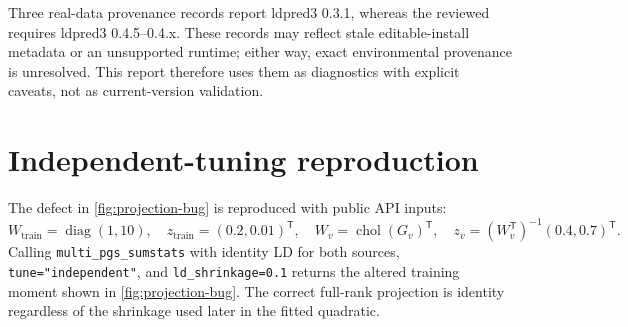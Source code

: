 \documentclass[10pt,a4paper]{article}
\newcommand{\code}[1]{\texttt{#1}}
\begin{document}
Three real-data provenance records report ldpred3 0.3.1, whereas the reviewed
 requires ldpred3 0.4.5--0.4.x. These records may reflect
stale editable-install metadata or an unsupported runtime; either way, exact
environmental provenance is unresolved. This report therefore uses them as
diagnostics with explicit caveats, not as current-version validation.

\section{Independent-tuning reproduction}
\label{app:reproduction}

The defect in \cref{fig:projection-bug} is reproduced with public API inputs:
\begin{equation}
  W_{\mathrm{train}}=\operatorname{diag}(1,10),
  \quad
  z_{\mathrm{train}}=(0.2,0.01)^{\mathsf T},
  \quad
  W_v=\operatorname{chol}(G_v)^{\mathsf T},
  \quad
  z_v=(W_v^{\mathsf T})^{-1}(0.4,0.7)^{\mathsf T}.
  \label{eq:bug-inputs}
\end{equation}
Calling \code{multi\_pgs\_sumstats} with identity LD for both sources,
\code{tune="independent"}, and \code{ld\_shrinkage=0.1} returns the altered
training moment shown in \cref{fig:projection-bug}. The correct full-rank
projection is identity regardless of the shrinkage used later in the fitted
quadratic.
\end{document}
